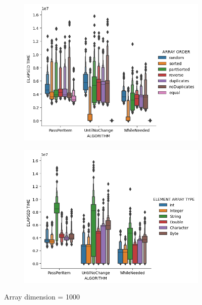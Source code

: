 \documentclass{article}
\begin{document}
\begin{figure}[H]
    \centering
    \begin{subfigure}[b]{0.4\textwidth}
        \centering
        \includegraphics[width=\textwidth]{./data/array_order_1000.png}
    \end{subfigure}
    \hfill
    \begin{subfigure}[b]{0.4\textwidth}
        \centering
        \includegraphics[width=\textwidth]{./data/array_type_1000.png}
    \end{subfigure}
    \caption{Array dimension = 1000}
\end{figure}
\end{document}
